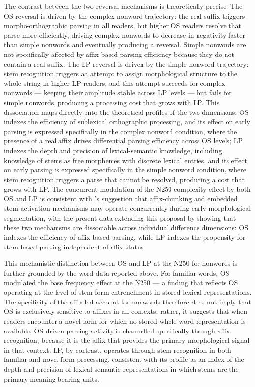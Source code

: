 The contrast between the two reversal mechanisms is theoretically 
precise. The OS reversal is driven by the complex nonword trajectory: 
the real suffix triggers morpho-orthographic parsing in all readers, 
but higher OS readers resolve that parse more efficiently, driving 
complex nonwords to decrease in negativity faster than simple nonwords 
and eventually producing a reversal. Simple nonwords are not 
specifically affected by affix-based parsing efficiency because they 
do not contain a real suffix. The LP reversal is driven by the simple 
nonword trajectory: stem recognition triggers an attempt to assign 
morphological structure to the whole string in higher LP readers, and 
this attempt succeeds for complex nonwords --- keeping their amplitude 
stable across LP levels --- but fails for simple nonwords, producing 
a processing cost that grows with LP. This dissociation maps directly 
onto the theoretical profiles of the two dimensions: OS indexes the 
efficiency of sublexical orthographic processing, and its effect on 
early parsing is expressed specifically in the complex nonword 
condition, where the presence of a real affix drives differential 
parsing efficiency across OS levels; LP indexes the depth and precision 
of lexical-semantic knowledge, including knowledge of stems as free 
morphemes with discrete lexical entries, and its effect on early 
parsing is expressed specifically in the simple nonword condition, 
where stem recognition triggers a parse that cannot be resolved, 
producing a cost that grows with LP. The concurrent modulation of the 
N250 complexity effect by both OS and LP is consistent with 
\citet{beyersmannEmbeddedStemPriming2016}'s suggestion that 
affix-chunking and embedded stem activation mechanisms may operate 
concurrently during early morphological segmentation, with the present 
data extending this proposal by showing that these two mechanisms are 
dissociable across individual difference dimensions: OS indexes the 
efficiency of affix-based parsing, while LP indexes the propensity for 
stem-based parsing independent of affix status.

This mechanistic distinction between OS and LP at the N250 for nonwords 
is further grounded by the word data reported above. For familiar 
words, OS modulated the base frequency effect at the N250 --- a finding 
that reflects OS operating at the level of stem-form entrenchment in 
stored lexical representations. The specificity of the affix-led 
account for nonwords therefore does not imply that OS is exclusively 
sensitive to affixes in all contexts; rather, it suggests that when 
readers encounter a novel form for which no stored whole-word 
representation is available, OS-driven parsing activity is channelled 
specifically through affix recognition, because it is the affix that 
provides the primary morphological signal in that context. LP, by 
contrast, operates through stem recognition in both familiar and novel 
form processing, consistent with its profile as an index of the depth 
and precision of lexical-semantic representations in which stems are 
the primary meaning-bearing units.
